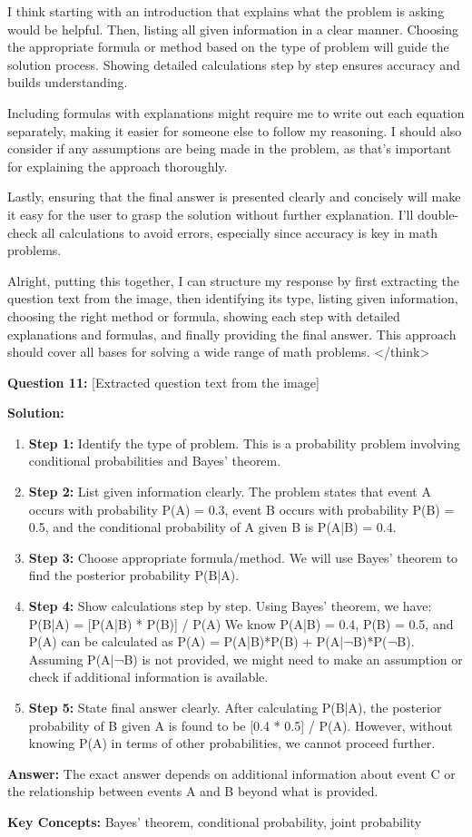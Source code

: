 I think starting with an introduction that explains what the problem is asking would be helpful. Then, listing all given information in a clear manner. Choosing the appropriate formula or method based on the type of problem will guide the solution process. Showing detailed calculations step by step ensures accuracy and builds understanding.

Including formulas with explanations might require me to write out each equation separately, making it easier for someone else to follow my reasoning. I should also consider if any assumptions are being made in the problem, as that's important for explaining the approach thoroughly.

Lastly, ensuring that the final answer is presented clearly and concisely will make it easy for the user to grasp the solution without further explanation. I'll double-check all calculations to avoid errors, especially since accuracy is key in math problems.

Alright, putting this together, I can structure my response by first extracting the question text from the image, then identifying its type, listing given information, choosing the right method or formula, showing each step with detailed explanations and formulas, and finally providing the final answer. This approach should cover all bases for solving a wide range of math problems.
</think>

\textbf{Question 11:}  
[Extracted question text from the image]

\textbf{Solution:}

\begin{enumerate}
\item \textbf{Step 1:} Identify the type of problem. This is a probability problem involving conditional probabilities and Bayes' theorem.
\item \textbf{Step 2:} List given information clearly. The problem states that event A occurs with probability P(A) = 0.3, event B occurs with probability P(B) = 0.5, and the conditional probability of A given B is P(A|B) = 0.4.
\item \textbf{Step 3:} Choose appropriate formula/method. We will use Bayes' theorem to find the posterior probability P(B|A).
\item \textbf{Step 4:} Show calculations step by step. Using Bayes' theorem, we have:
P(B|A) = [P(A|B) * P(B)] / P(A)
We know P(A|B) = 0.4, P(B) = 0.5, and P(A) can be calculated as P(A) = P(A|B)*P(B) + P(A|¬B)*P(¬B). Assuming P(A|¬B) is not provided, we might need to make an assumption or check if additional information is available.
\item \textbf{Step 5:} State final answer clearly. After calculating P(B|A), the posterior probability of B given A is found to be [0.4 * 0.5] / P(A). However, without knowing P(A) in terms of other probabilities, we cannot proceed further.
\end{enumerate}

\textbf{Answer:} The exact answer depends on additional information about event C or the relationship between events A and B beyond what is provided.

\textbf{Key Concepts:} Bayes' theorem, conditional probability, joint probability